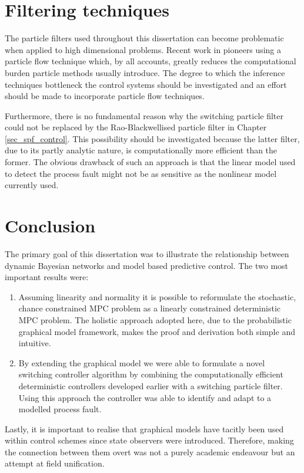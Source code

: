 \section{Filtering techniques}
The particle filters used throughout this dissertation can become problematic when applied to high dimensional problems. Recent work in \cite{daum} pioneers using a particle flow technique which, by all accounts, greatly reduces the computational burden particle methods usually introduce. The degree to which the inference techniques bottleneck the control systems should be investigated and an effort should be made to incorporate particle flow techniques. 

Furthermore, there is no fundamental reason why the switching particle filter could not be replaced by the Rao-Blackwellised particle filter in Chapter \ref{sec_spf_control}. This possibility should be investigated because the latter filter, due to its partly analytic nature, is computationally more efficient than the former. The obvious drawback of such an approach is that the linear model used to detect the process fault might not be as sensitive as the nonlinear model currently used.

\section{Conclusion}
The primary goal of this dissertation was to illustrate the relationship between dynamic Bayesian networks and model based predictive control. The two most important results were:
\begin{enumerate}
\item
Assuming linearity and normality it is possible to reformulate the stochastic, chance constrained MPC problem as a linearly constrained deterministic MPC problem. The holistic approach adopted here, due to the probabilistic graphical model framework, makes the proof and derivation both simple and intuitive.
\item
By extending the graphical model we were able to formulate a novel switching controller algorithm by combining the computationally efficient deterministic controllers developed earlier with a switching particle filter. Using this approach the controller was able to identify and adapt to a modelled process fault.
\end{enumerate} 
Lastly, it is important to realise that graphical models have tacitly been used within control schemes since state observers were introduced. Therefore, making the connection between them overt was not a purely academic endeavour but an attempt at field unification.
